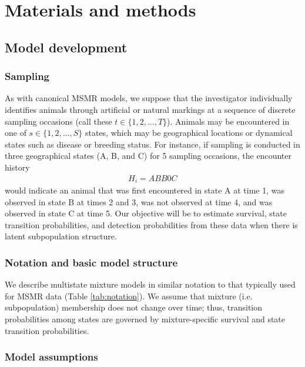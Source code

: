 \documentclass[times,mee,doublespace,]{besauth2}
\begin{document}
\section{Materials and methods}

\subsection{Model development}

\subsubsection{Sampling}

As with canonical MSMR models, we suppose that the investigator individually identifies animals through artificial or natural markings at a sequence of discrete sampling occasions (call these  $t \in \{ 1, 2, \hdots, T \}$). Animals may be encountered in one of $s \in \{ 1, 2, \hdots, S \}$ states, which may be geographical locations or dynamical states such as disease or breeding status. For instance, if sampling is conducted in three geographical states (A, B, and C) for 5 sampling occasions, the encounter history
\begin{eqnarray*}
  H_i = ABB0C
\end{eqnarray*}
would indicate an animal that was first encountered in state A at time 1, was observed in state B at times 2 and 3, was not observed at time 4, and was observed in state C at time 5.  Our objective will be to estimate survival, state transition probabilities, and detection probabilities from these data when there is latent subpopulation structure.

\subsubsection{Notation and basic model structure}

We describe multistate mixture models in similar notation to that typically used for MSMR data (Table \ref{tab:notation}). We assume that mixture (i.e. subpopulation) membership does not change over time; thus, transition probabilities among states are governed by mixture-specific survival and state transition probabilities.  



\subsubsection{Model assumptions}
\end{document}

